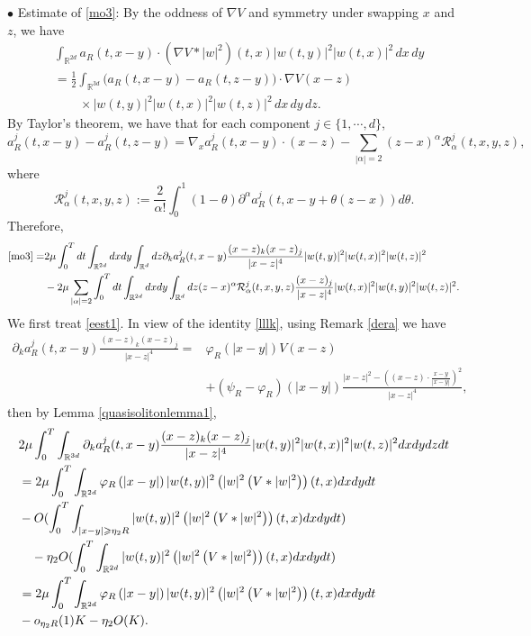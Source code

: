 \documentclass[reqno,11pt]{amsart}
\theoremstyle{plain}
\theoremstyle{definition}
\numberwithin{equation}{section}
\numberwithin{theorem}{section}
\def\geq{\geqslant}
\def\R{\mathbb{R}}
\begin{document}
$\bullet$ Estimate of \eqref{mo3}: By the oddness of $\nabla V$ and
symmetry under swapping $x$ and $z$, we have
\begin{align*}
 &\int_{\R^{2d}}a_R(t,x-y)\cdot(\nabla V*|w|^2)(t,x)
                   |w(t,y)|^2|w(t,x)|^2\,dx\,dy\\
 &=\frac12\int_{\R^{3d}}
       \big(a_R(t,x-y)-a_R(t,z-y)\big)\cdot\nabla V(x-z)\\
 &\qquad\times|w(t,y)|^2|w(t,x)|^2|w(t,z)|^2\,dx\,dy\,dz.
\end{align*}
By Taylor's theorem, we have that for each component $j \in\{1,\cdots,d\}$,
\begin{equation*}
a_{R}^{j}(t, x-y)-a_{R}^{j}(t, z-y)=\nabla_{x} a_{R}^{j}(t, x-y) \cdot(x-z)-\sum_{|\alpha|=2}(z-x)^{\alpha} \mathcal{R}_{\alpha}^{j}(t, x, y, z),
\end{equation*}
where
\[
\mathcal{R}_{\alpha}^{j}(t, x, y, z):=\frac{2}{\alpha!} \int_{0}^{1}(1-\theta) \partial^{\alpha} a_{R}^{j}(t, x-y+\theta(z-x)) d \theta.
\]
Therefore,
\begin{align}
\eqref{mo3}= & 2\mu \int_0^T dt\int_{\mathbb{R}^{2d}} d x d y \int_{\mathbb{R}^{d}} d z \partial_{k} a_{R}^{j}(t, x-y) \frac{(x-z)_{k}(x-z)_{j}}{|x-z|^{4}}|w(t, y)|^{2}|w(t, x)|^{2}|w(t, z)|^{2} \label{eest1}\\
& -2\mu \sum_{|\alpha|=2}\int_0^Tdt \int_{\mathbb{R}^{2d}} d x d y \int_{\mathbb{R}^{d}} d z(z-x)^{\alpha} \mathcal{R}_{\alpha}^{j}(t, x, y, z) \frac{(x-z)_{j}}{|x-z|^{4}}|w(t, x)|^{2}|w(t, y)|^{2}|w(t, z)|^{2} \label{eest2}.
\end{align}
We first treat \eqref{eest1}. In view of the identity \eqref{lllk}, using Remark \ref{dera} we have
\begin{align*}
\partial_{k} a_{R}^{j}(t, x-y) \frac{(x-z)_{k}(x-z)_{j}}{|x-z|^{4}}
={}&\varphi_R(|x-y|)V(x-z)\\
&+(\psi_R-\varphi_R)(|x-y|)
\frac{|x-z|^2-\left((x-z)\cdot\frac{x-y}{|x-y|}\right)^2}{|x-z|^4},
\end{align*}
then by Lemma \ref{quasisolitonlemma1},
\begin{align}
& 2\mu \int_{0}^{T} \int_{\mathbb{R}^{3d}} \partial_{k} a_{R}^{j}(t, x-y) \frac{(x-z)_{k}(x-z)_{j}}{|x-z|^{4}}|w(t, y)|^{2}|w(t, x)|^{2}|w(t, z)|^{2} d x d y d z d t\notag \\
& = 2\mu \int_{0}^{T} \int_{\mathbb{R}^{2d}} \varphi_{R}\left(|x-y|\right)|w(t, y)|^{2}\left(|w|^{2}\left(V *|w|^{2}\right)\right)(t, x) d x d y d t\notag  \\
& -O(\int_{0}^{T} \int_{|x-y| \geq \eta_2R} |w(t, y)|^{2}\left(|w|^{2}\left(V *|w|^{2}\right)\right)(t, x) d x d y d t) \notag \\
& \quad- \eta_{2} O(\int_{0}^{T} \int_{\mathbb{R}^{2d}} |w(t, y)|^{2}\left(|w|^{2}\left(V *|w|^{2}\right)\right)(t, x) d x d y d t)\\
& = 2\mu\int_{0}^{T} \int_{\mathbb{R}^{2d}} \varphi_{R}\left(|x-y|\right)|w(t, y)|^{2}\left(|w|^{2}\left(V *|w|{ }^{2}\right)\right)(t, x) d x d y d t \notag \\
&-o_{\eta_2 R}(1)K-\eta_2O(K).\label{eest1q}
\end{align}
\end{document}
